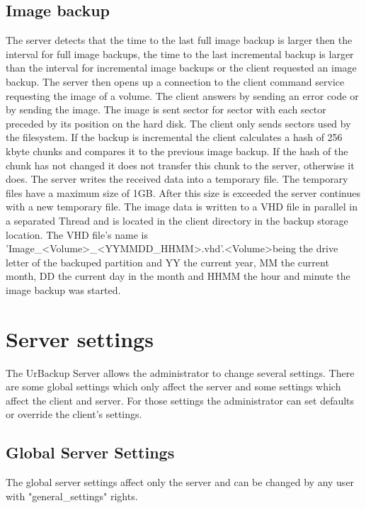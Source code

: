\documentclass[a4paper,10pt]{article}
\begin{document}
\subsection{Image backup}

The server detects that the time to the last full image backup is larger then the interval for full image backups, the time to the last incremental backup is larger than the interval for incremental image backups or the client requested an image backup. The server then opens up a connection to the client command service requesting the image of a volume. The client answers by sending an error code or by sending the image. The image is sent sector for sector with each sector preceded by its position on the hard disk. The client only sends sectors used by the filesystem. If the backup is incremental the client calculates a hash of 256 kbyte chunks and compares it to the previous image backup. If the hash of the chunk has not changed it does not transfer this chunk to the server, otherwise it does. The server writes the received data into a temporary file. The temporary files have a maximum size of 1GB. After this size is exceeded the server continues with a new temporary file. The image data is written to a VHD file in parallel in a separated Thread and is located in the client directory in the backup storage location. The VHD file's name is 'Image\_\textless Volume\textgreater\_\textless YYMMDD\_HHMM\textgreater.vhd'.\textless Volume\textgreater  being the drive letter of the backuped partition and YY the current year, MM the current month, DD the current day in the month and HHMM the hour and minute the image backup was started.

\section{Server settings}
\label{server_settings}

The UrBackup Server allows the administrator to change several settings. There are some global settings which only affect the server and some settings which affect the client and server. For those settings the administrator can set defaults or override the client's settings.

\subsection{Global Server Settings}

The global server settings affect only the server and can be changed by any user with "general\_settings" rights.
\end{document}
